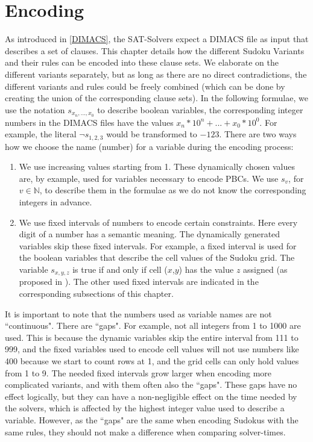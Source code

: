\chapter{Encoding}\label{Encoding}
As introduced in \ref{DIMACS}, the SAT-Solvers expect a DIMACS file as input that describes a set of clauses. This chapter details how the different Sudoku Variants and their rules can be encoded into these clause sets. We elaborate on the different variants separately, but as long as there are no direct contradictions, the different variants and rules could be freely combined (which can be done by creating the union of the corresponding clause sets). In the following formulae, we use the notation $s_{x_{n},...,x_{0}}$ to describe boolean variables, the corresponding integer numbers in the DIMACS files have the values $x_{n}*10^{n}+...+x_{0}*10^{0}$. For example, the literal $\neg s_{1,2,3}$ would be transformed to $-123$. There are two ways how we choose the name (number) for a variable during the encoding process:

\begin{enumerate}
    \item We use increasing values starting from 1. These dynamically chosen values are, by example, used for variables necessary to encode PBCs. We use $s_{v}$, for $v \in \mathbb{N}$, to describe them in the formulae as we do not know the corresponding integers in advance.
    \item  We use fixed intervals of numbers to encode certain constraints. Here every digit of a number has a semantic meaning. The dynamically generated variables skip these fixed intervals. For example, a fixed interval is used for the boolean variables that describe the cell values of the Sudoku grid. The variable $s_{x,y,z}$ is true if and only if cell ($x$,$y$) has the value $z$ assigned (as proposed in \cite{Lynce2006SudokuAsASATProblem}). The other used fixed intervals are indicated in the corresponding subsections of this chapter. 
\end{enumerate}

It is important to note that the numbers used as variable names are not ``continuous". There are ``gaps". For example, not all integers from 1 to 1000 are used. This is because the dynamic variables skip the entire interval from 111 to 999, and the fixed variables used to encode cell values will not use numbers like 400 because we start to count rows at 1, and the grid cells can only hold values from 1 to 9. The needed fixed intervals grow larger when encoding more complicated variants, and with them often also the ``gaps". These gaps have no effect logically, but they can have a non-negligible effect on the time needed by the solvers, which is affected by the highest integer value used to describe a variable. However, as the ``gaps" are the same when encoding Sudokus with the same rules, they should not make a difference when comparing solver-times.

